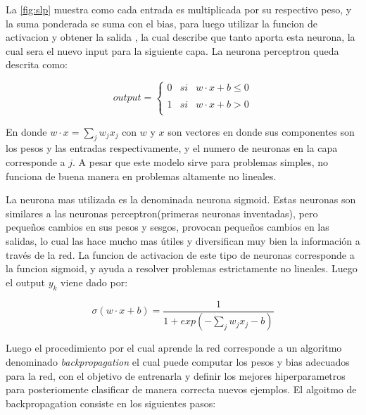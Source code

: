 La \autoref{fig:slp} muestra como cada entrada es multiplicada por su respectivo peso, y la suma ponderada se suma con el bias, para luego utilizar la funcion de activacion y obtener la salida , la cual describe que tanto aporta esta neurona, la cual sera el nuevo input para la siguiente capa. La neurona perceptron queda descrita como:

\begin{equation}
output = \left\{ \begin{array}{lcc}
             0 &   si  & w \cdot x + b \leq 0 \\
             \\ 1 &  si & w \cdot x + b > 0 \\
             \end{array} \right.
\end{equation}

En donde $ w\cdot x = \sum_{j} w_{j} x_{j} $ con $w$ y $x$ son vectores en donde sus componentes son los pesos y las entradas respectivamente, y el numero de neuronas en la capa corresponde a $j$. A pesar que este modelo sirve para problemas simples, no funciona de buena manera en problemas altamente no lineales. 

La neurona mas utilizada es la denominada neurona sigmoid. Estas neuronas son similares a las neuronas perceptron(primeras neuronas inventadas), pero pequeños cambios en sus pesos y sesgos, provocan pequeños cambios en las salidas, lo cual las hace mucho mas útiles y diversifican muy bien la información a través de la red. La funcion de activacion de este tipo de neuronas corresponde a la funcion sigmoid, y ayuda a resolver problemas estrictamente no lineales. Luego el output $y_{k}$ viene dado por:


$$ \sigma( w \cdot x + b) = \frac{1}{1 + exp(- \sum_{j} w_{j}x_{j} - b)}$$

Luego el procedimiento por el cual aprende la red corresponde a un algoritmo denominado \textit{backpropagation} el cual puede computar los pesos y bias adecuados para la red, con el objetivo de entrenarla y definir los mejores hiperparametros para posteriomente clasificar de manera correcta nuevos ejemplos. El algoitmo de backpropagation consiste en los siguientes pasos:

